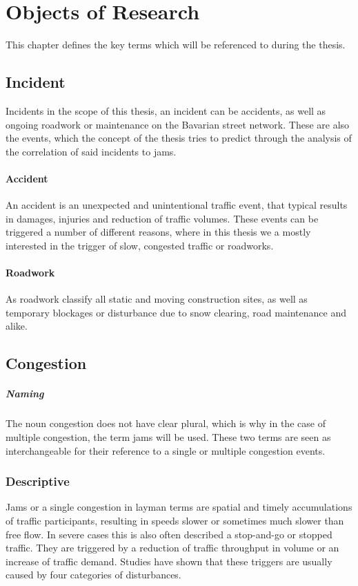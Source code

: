 \documentclass[a4paper,12pt]{report}
\begin{document}
\chapter{Objects of Research}
	This chapter defines the key terms which will be referenced to during the thesis.
\section{Incident}
		Incidents in the scope of this thesis, an incident can be accidents, as well as ongoing roadwork or maintenance on the Bavarian street network. These are also the events, which the concept of the thesis tries to predict through the analysis of the correlation of said incidents to jams.
	\subsubsection{Accident}
		An accident is an unexpected and unintentional traffic event, that typical results in damages, injuries and reduction of traffic volumes. These events can be triggered a number of different reasons, where in this thesis we a mostly interested in the trigger of slow, congested traffic or roadworks.
	\subsubsection{Roadwork}
		As roadwork classify all static and moving construction sites, as well as temporary blockages or disturbance due to snow clearing, road maintenance and alike. 
	
\section{Congestion}
\label{definition_congestion}

\paragraph{Naming} The noun congestion does not have clear plural, which is why in the case of multiple congestion, the term jams will be used. These two terms are seen as interchangeable for their reference to a single or multiple congestion events.

\subsection{Descriptive}

Jams or a single congestion in layman terms are spatial and timely accumulations of traffic participants, resulting in speeds slower or sometimes much slower than free flow. In severe cases this is also often described a stop-and-go or stopped traffic. They are triggered by a reduction of traffic throughput in volume or an increase of traffic demand. Studies have shown that these triggers are usually caused by four categories of disturbances. \cite{TRB2003,FHA2011}
\end{document}
